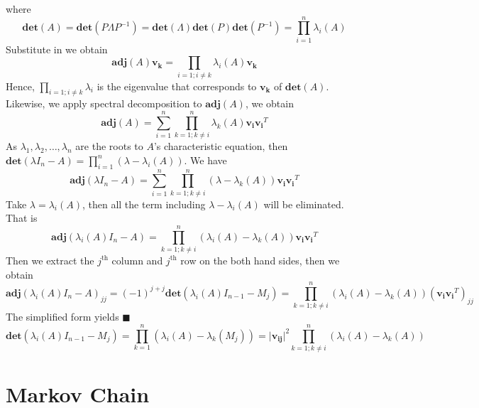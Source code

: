 \documentclass[11pt]{article}
\begin{document}
where
\begin{equation}
    \bm{det}(A) = \bm{det}(P\Lambda P^{-1}) = \bm{det}(\Lambda) \bm{det}(P) \bm{det}(P^{-1}) = \prod_{i=1}^n \lambda_i(A)
\end{equation}
Substitute in we obtain
\begin{equation}
    \bm{adj}(A) \bm{v_k} = \prod_{i=1;i \neq k}\lambda_i(A) \bm{v_k}
\end{equation}
Hence, $\prod_{i=1;i \neq k}\lambda_i$ is the eigenvalue that corresponds to $\bm{v_k}$ of $\bm{det}(A)$. Likewise, we apply spectral decomposition to $\bm{adj}(A)$, we obtain
\begin{equation}
    \bm{adj}(A) = \sum_{i=1}^n \prod_{k=1;k\neq i}^n \lambda_k(A) \bm{v_i}\bm{v_i}^T
\end{equation}
As $\lambda_1, \lambda_2, \dots, \lambda_n$ are the roots to $A$'s characteristic equation, then $\bm{det}(\lambda I_n - A) = \prod_{i=1}^n (\lambda - \lambda_i(A))$. We have
\begin{equation}
    \bm{adj}(\lambda I_n - A) = \sum_{i=1}^n \prod_{k=1;k\neq i}^n (\lambda - \lambda_k(A))\bm{v_i}\bm{v_i}^T
\end{equation}
Take $\lambda = \lambda_i(A)$, then all the term including $\lambda - \lambda_i(A)$ will be eliminated. That is
\begin{equation}
    \bm{adj}(\lambda_i(A)I_n - A) = \prod_{k=1;k\neq i}^n (\lambda_i(A) - \lambda_k(A))\bm{v_i}\bm{v_i}^T
\end{equation}
Then we extract the $j^{\text{th}}$ column and $j^{\text{th}}$ row on the both hand sides, then we obtain
\begin{equation}
    \bm{adj}(\lambda_i(A)I_n - A)_{jj} = (-1)^{j+j}\bm{det}(\lambda_i(A)I_{n-1} - M_j)= \prod_{k=1;k\neq i}^n (\lambda_i(A) - \lambda_k(A))(\bm{v_i}\bm{v_i}^T)_{jj}
\end{equation}
The simplified form yields \hfill $\blacksquare$
\begin{equation}
    \bm{det}(\lambda_i(A)I_{n-1} - M_j) = \prod_{k=1}^n (\lambda_i(A) - \lambda_k(M_j)) = \lvert \bm{v_{ij}} \rvert ^2\prod_{k=1;k\neq i}^n (\lambda_i(A) - \lambda_k(A))
\end{equation}
\section{Markov Chain}
\end{document}
